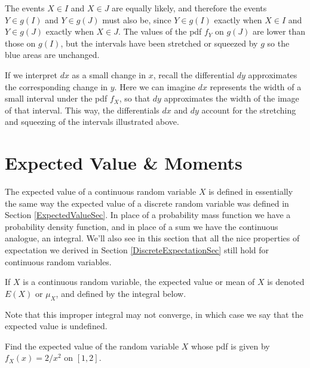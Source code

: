 The events $X \in I$ and $X \in J$ are equally likely, and therefore the events $Y \in g(I)$ and $Y \in g(J)$ must also be, since $Y \in g(I)$ exactly when $X \in I$ and $Y \in g(J)$ exactly when $X \in J$. The values of the pdf $f_Y$ on $g(J)$ are lower than those on $g(I)$, but the intervals have been stretched or squeezed by $g$ so the blue areas are unchanged.
\par
If we interpret $dx$ as a small change in $x$, recall the differential $dy$ approximates the corresponding change in $y$. Here we can imagine $dx$ represents the width of a small interval under the pdf $f_X$, so that $dy$ approximates the width of the image of that interval. This way, the differentials $dx$ and $dy$ account for the stretching and squeezing of the intervals illustrated above.

\section{Expected Value \& Moments}\label{ContinuousMomentsSec}

The expected value of a continuous random variable $X$ is defined in essentially the same way the expected value of a discrete random variable was defined in Section \ref{ExpectedValueSec}. In place of a probability mass function we have a probability density function, and in place of a sum we have the continuous analogue, an integral. We'll also see in this section that all the nice properties of expectation we derived in Section \ref{DiscreteExpectationSec} still hold for continuous random variables.

\begin{defn}
If $X$ is a continuous random variable, the expected value or mean of $X$ is denoted $E(X)$ or $\mu_X$, and defined by the integral below.
\par
\noindent Note that this improper integral may not converge, in which case we say that the expected value is undefined.
\end{defn}

\begin{examp}Find the expected value of the random variable $X$ whose pdf is given by $f_X(x) = 2/x^2$ on $[1,2]$.
\end{examp}

